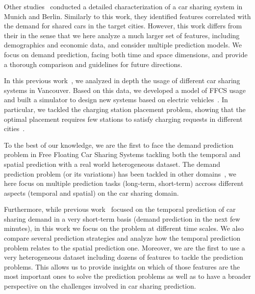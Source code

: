 Other studies~\citep{schmoller2014analyzing,Schmoller2015} conducted a detailed characterization of a car sharing system in Munich and Berlin. Similarly to this work, they identified features correlated with the demand for shared cars in the target cities. However, this work differs from their in the sense that we here analyze a much larger set of features, including demographics and economic data, and consider multiple prediction models. We focus on demand prediction, facing both time and space dimensions, and provide a thorough comparison and guidelines for future directions.

In this previous work~\citep{VancouverCS}, we analyzed in depth the usage of different car sharing systems in Vancouver. Based on this data, we developed a model of FFCS usage and built a simulator to design new systems based on electric vehicles~\citep{coccacar}. In particular, we tackled the charging station placement problem, showing that the optimal placement requires few stations to satisfy charging requests in different cities~\citep{coccaopt}.  

To the best of our knowledge, we are the first to face the demand prediction problem in Free Floating Car Sharing Systems tackling both the temporal and spatial prediction with a real world heterogeneous dataset. The demand prediction problem (or its variations) has been tackled in other domains~\citep{He:2019,Hulot:2018}, we here focus on multiple prediction tasks (long-term, short-term) accross different aspects (temporal and spatial) on the car sharing domain.


Furthermore, while previous work~\citep{wang2017deepsd} focused on the temporal prediction of car sharing demand in a very short-term basis (demand prediction in the next few minutes), in this work we focus on the problem at different time scales. We also compare several prediction strategies and analyze how the temporal prediction problem relates to the spatial prediction one.
Moreover, we are the first to use a very heterogeneous dataset including dozens of features to tackle the prediction problems. This allows us to provide insights on which of those features are the most important ones to solve the prediction problems as well as to have a broader perspective on the challenges involved in car sharing prediction.
